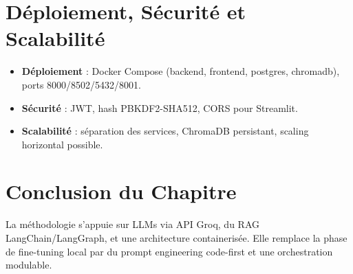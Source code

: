 \section{Déploiement, Sécurité et Scalabilité}
\begin{itemize}
    \item \textbf{Déploiement} : Docker Compose (backend, frontend, postgres, chromadb), ports 8000/8502/5432/8001.
    \item \textbf{Sécurité} : JWT, hash PBKDF2-SHA512, CORS pour Streamlit.
    \item \textbf{Scalabilité} : séparation des services, ChromaDB persistant, scaling horizontal possible.
\end{itemize}

\section{Conclusion du Chapitre}

La méthodologie s’appuie sur LLMs via API Groq, du RAG LangChain/LangGraph, et une architecture containerisée. Elle remplace la phase de fine-tuning local par du prompt engineering code-first et une orchestration modulable. 
